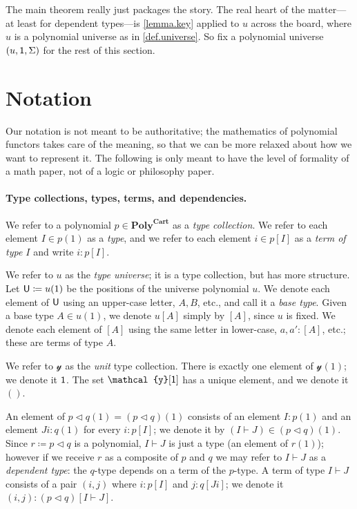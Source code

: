 \documentclass[11pt, one side, article]{memoir}
\theoremstyle{definition}
\theoremstyle{plain}
\newcommand{\Cat}[1]{\mathbf{#1}}%
\newcommand{\tn}[1]{\textnormal{#1}}
\newcommand{\yon}{\mathcal{y}}
\newcommand{\poly}{\Cat{Poly}}
\newcommand{\polycart}{\poly^{\Cat{Cart}}}
\newcommand{\0}{\textsf{0}}
\newcommand{\1}{\tn{\textsf{1}}}
\newcommand{\U}{\tn{\textsf{U}}}
\newcommand{\tri}{\mathbin{\triangleleft}}
\begin{document}
The main theorem really just packages the story. The real heart of the matter---at least for dependent types---is \cref{lemma.key} applied to $u$ across the board, where $u$ is a polynomial universe as in \cref{def.universe}. So fix a polynomial universe $(u,\1,\Sigma)$ for the rest of this section.

\section{Notation}

Our notation is not meant to be authoritative; the mathematics of polynomial functors takes care of the meaning, so that we can be more relaxed about how we want to represent it. The following is only meant to have the level of formality of a math paper, not of a logic or philosophy paper.

\paragraph{Type collections, types, terms, and dependencies.}
We refer to a polynomial $p\in\polycart$ as a \emph{type collection}. We refer to each element $I\in p(1)$ as a \emph{type}, and we refer to each element $i\in p[I]$ as a \emph{term of type $I$} and write $i:p[I]$.

We refer to $u$ as the \emph{type universe}; it is a type collection, but has more structure. Let $\U\coloneqq u(1)$ be the positions of the universe polynomial $u$. We denote each element of $\U$ using an upper-case letter, $A,B$, etc., and call it a \emph{base type}. Given a base type $A\in u(1)$, we denote $u[A]$ simply by $[A]$, since $u$ is fixed. We denote each element of $[A]$ using the same letter in lower-case, $a,a':[A]$, etc.; these are terms of type $A$.

We refer to $\yon$ as the \emph{unit} type collection. There is exactly one element of $\yon(1)$; we denote it $\1$. The set $\yon[\1]$ has a unique element, and we denote it $()$.

An element of $p\tri q(1)=(p\tri q)(1)$ consists of an element $I:p(1)$ and an element $J i:q(1)$ for every $i:p[I]$; we denote it by $(I\vdash J)\in (p\tri q)(1)$. Since $r\coloneqq p\tri q$ is a polynomial, $I\vdash J$ is just a type (an element of $r(1)$); however if we receive $r$ as a composite of $p$ and $q$ we may refer to $I\vdash J$ as a \emph{dependent type}: the $q$-type depends on a term of the $p$-type. A term of type $I\vdash J$ consists of a pair $(i,j)$ where $i:p[I]$ and $j: q[J i]$; we denote it $(i,j):(p\tri q)[I\vdash J]$.
\end{document}
